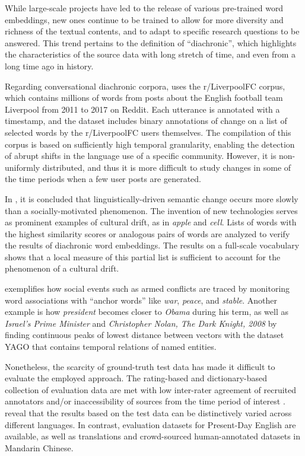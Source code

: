While large-scale projects have led to the release of various pre-trained word embeddings, new ones continue to be trained to allow for more diversity and richness of the textual contents, and to adapt to specific research questions to be answered. This trend pertains to the definition of ``diachronic'', which highlights the characteristics of the source data with long stretch of time, and even from a long time ago in history.

Regarding conversational diachronic corpora, \textcite{giulianelli2019lexical} uses the r/LiverpoolFC corpus, which contains millions of words from posts about the English football team Liverpool from 2011 to 2017 on Reddit. Each utterance is annotated with a timestamp, and the dataset includes binary annotations of change on a list of selected words by the r/LiverpoolFC users themselves. The compilation of this corpus is based on sufficiently high temporal granularity, enabling the detection of abrupt shifts in the language use of a specific community. However, it is non-uniformly distributed, and thus it is more difficult to study changes in some of the time periods when a few user posts are generated.

In \textcite{hamilton2016cultural}, it is concluded that linguistically-driven semantic change occurs more slowly than a socially-motivated phenomenon. The invention of new technologies serves as prominent examples of cultural drift, as in \textit{apple} and \textit{cell}. Lists of words with the highest similarity scores or analogous pairs of words are analyzed to verify the results of diachronic word embeddings. The results on a full-scale vocabulary shows that a local measure of this partial list is sufficient to account for the phenomenon of a cultural drift.

\textcite{kutuzov2017tracing} exemplifies how social events such as armed conflicts are traced by monitoring word associations with ``anchor words'' like \textit{war}, \textit{peace}, and \textit{stable}. Another example is how \textit{president} becomes closer to \textit{Obama} during his term, as well as \textit{Israel's Prime Minister} and \textit{Christopher Nolan, The Dark Knight, 2008} \parencite{rosin2017learning} by finding continuous peaks of lowest distance between vectors with the dataset YAGO that contains temporal relations of named entities.

Nonetheless, the scarcity of ground-truth test data has made it difficult to evaluate the employed approach. The rating-based and dictionary-based collection of evaluation data are met with low inter-rater agreement of recruited annotators and/or inaccessibility of sources from the time period of interest \parencite{tang2018state}. \textcite{kutuzov2020uio} reveal that the results based on the test data can be distinctively varied across different languages. In contrast, evaluation datasets for Present-Day English are available, as well as translations and crowd-sourced human-annotated datasets in Mandarin Chinese.

